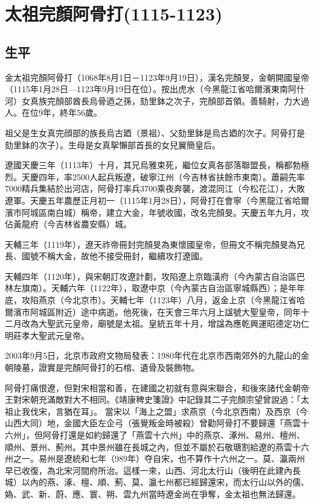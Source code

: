 
\section{太祖完顏阿骨打\tiny(1115-1123)}

\subsection{生平}

金太祖完顏阿骨打（1068年8月1日－1123年9月19日），漢名完顏旻，金朝開國皇帝（1115年1月28日—1123年9月19日在位）。按出虎水（今黑龍江省哈爾濱東南阿什河）女真族完顏部酋長烏骨迺之孫，劾里鉢之次子，完顏部首領。善騎射，力大過人。在位9年，終年56歲。

祖父是生女真完顔部的族長烏古廼（景祖）、父劾里鉢是烏古廼的次子。阿骨打是劾里鉢的次子）。生母是女真挐懶部首長的女兒翼簡皇后。

遼國天慶三年（1113年）十月，其兄烏雅束死，繼位女真各部落聯盟長，稱都勃極烈。天慶四年，率2500人起兵叛遼，破寧江州（今吉林省扶餘市東南）。蕭嗣先率7000精兵集結於出河店，阿骨打率兵3700乘夜奔襲，渡混同江（今松花江），大敗遼軍。天慶五年農歷正月初一（1115年1月28日），阿骨打在會寧（今黑龍江省哈爾濱市阿城區南白城）稱帝，建立大金，年號收國，改名完顏旻。天慶五年九月，攻佔黃龍府（今吉林省農安縣）城。

天輔三年（1119年），遼天祚帝冊封完顏旻為東懷國皇帝，但冊文不稱完顏旻為兄長、國號不稱大金，故他不接受冊封，繼續攻打遼國。

天輔四年（1120年），與宋朝訂攻遼計劃，攻陷遼上京臨潢府（今內蒙古自治區巴林左旗南）。天輔六年（1122年），取遼中京（今內蒙古自治區寧城縣西）；是年年底，攻陷燕京（今北京市）。天輔七年（1123年）八月，返金上京（今黑龍江省哈爾濱市阿城區附近）途中病逝。他死後，在天會三年六月上諡號大聖皇帝，同年十二月改為大聖武元皇帝，廟號是太祖。皇統五年十月，增諡為應乾興運昭德定功仁明莊孝大聖武元皇帝。

2003年9月5日，北京市政府文物局發表：1980年代在北京市西南郊外的九龍山的金朝陵墓，證實是完顏阿骨打的石棺、遺骨及裝飾物。

阿骨打痛恨遼，但對宋相當和善，在建國之初就有意與宋聯合，和後來諸代金朝帝王對宋朝充滿敵對大不相同。《靖康稗史箋證》中記錄其二子完顏宗望曾說過：「太祖止我伐宋，言猶在耳」。 當宋以「海上之盟」求燕京（今北京西南）及西京（今山西大同）地，金國大臣左企弓（張覺叛金時被殺）曾勸阿骨打不要歸還「燕雲十六州」，但阿骨打還是如約歸還了「燕雲十六州」中的燕京、涿州、易州、檀州、順州、景州、薊州。其中景州雖在長城之內，但並不屬於石敬瑭割給遼的燕雲十六州之一。易州是遼統和七年（989年）夺自宋，也不算作十六州之一。莫、瀛兩州早已收復，為北宋河間府所治。這樣一來，山西、河北太行山（後明在此建內長城）以內的燕、涿、檀、順、薊、莫、瀛七州都已經歸還宋，而太行山以外的儒、媯、武、新、蔚、應、寰、朔、雲九州當時遼金尚在爭奪，金太祖也無法歸還。


